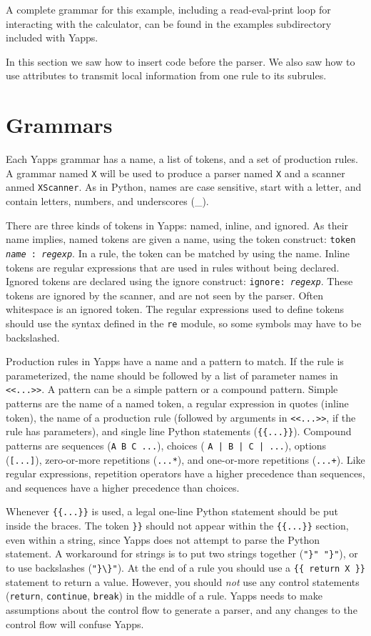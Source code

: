 \documentclass[10pt]{article}
\newcommand{\mysection}[1]{\section{#1}}
\begin{document}
A complete grammar for this example, including a read-eval-print loop
for interacting with the calculator, can be found in the examples
subdirectory included with Yapps.

In this section we saw how to insert code before the parser.  We also
saw how to use attributes to transmit local information from one rule
to its subrules.

\mysection{Grammars}

Each Yapps grammar has a name, a list of tokens, and a set of
production rules.  A grammar named \texttt{X} will be used to produce
a parser named \texttt{X} and a scanner anmed \texttt{XScanner}.  As
in Python, names are case sensitive, start with a letter, and contain
letters, numbers, and underscores (\_).

There are three kinds of tokens in Yapps: named, inline, and ignored.
As their name implies, named tokens are given a name, using the token
construct: \texttt{token \emph{name} : \emph{regexp}}.  In a rule, the
token can be matched by using the name.  Inline tokens are regular
expressions that are used in rules without being declared.  Ignored
tokens are declared using the ignore construct: \texttt{ignore:
  \emph{regexp}}.  These tokens are ignored by the scanner, and are
not seen by the parser.  Often whitespace is an ignored token.  The
regular expressions used to define tokens should use the syntax
defined in the \texttt{re} module, so some symbols may have to be
backslashed.

Production rules in Yapps have a name and a pattern to match.  If the
rule is parameterized, the name should be followed by a list of
parameter names in \verb|<<...>>|.  A pattern can be a simple pattern
or a compound pattern.  Simple patterns are the name of a named token,
a regular expression in quotes (inline token), the name of a
production rule (followed by arguments in \verb|<<...>>|, if the rule
has parameters), and single line Python statements (\verb|{{...}}|).
Compound patterns are sequences (\verb|A B C ...|), choices (
\verb:A | B | C | ...:), options (\verb|[...]|), zero-or-more repetitions
(\verb|...*|), and one-or-more repetitions (\verb|...+|).  Like
regular expressions, repetition operators have a higher precedence
than sequences, and sequences have a higher precedence than choices.

Whenever \verb|{{...}}| is used, a legal one-line Python statement
should be put inside the braces.  The token \verb|}}| should not
appear within the \verb|{{...}}| section, even within a string, since
Yapps does not attempt to parse the Python statement.  A workaround
for strings is to put two strings together (\verb|"}" "}"|), or to use
backslashes (\verb|"}\}"|).  At the end of a rule you should use a
\verb|{{ return X }}| statement to return a value.  However, you
should \emph{not} use any control statements (\texttt{return},
\texttt{continue}, \texttt{break}) in the middle of a rule.  Yapps
needs to make assumptions about the control flow to generate a parser,
and any changes to the control flow will confuse Yapps.
\end{document}
